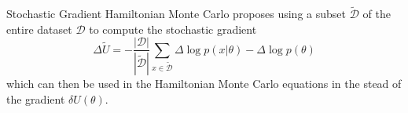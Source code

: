 Stochastic Gradient Hamiltonian Monte Carlo proposes using a subset $\tilde{\mathcal{D}}$ of the entire dataset $\mathcal{D}$ to compute the stochastic gradient
\begin{equation*}
	\Delta\tilde{U}=-\frac{|\mathcal{D}|}{|\tilde{\mathcal{D}}|}\sum_{x\in\tilde{\mathcal{D}}}\Delta\log p(x|\theta) - \Delta\log p(\theta)
\end{equation*}
which can then be used in the Hamiltonian Monte Carlo equations in the stead of the gradient $\delta U(\theta)$.